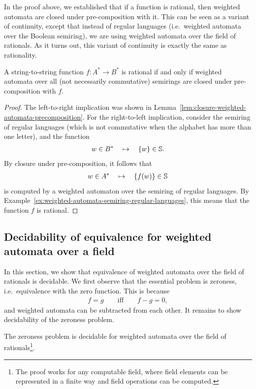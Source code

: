 In the proof above, we established that if a function is rational, then weighted automata are closed under pre-composition with it. This can be seen as a variant of continuity, except that instead of regular languages  (i.e.~weighted automata over the Boolean semiring), we are using weighted automata over the field of rationals. As it turns out, this variant of continuity is exactly the same as rationality.
\begin{theorem}\label{thm:characterisation-rational-functions-weighted-automata}
    A string-to-string function $f : A^* \to B^*$ is rational if and only if weighted automata over all (not necessarily commutative) semirings are closed under pre-composition with $f$.
\end{theorem}

\begin{proof}
    The left-to-right implication was shown in Lemma~\ref{lem:closure-weighted-automata-precomposition}. For the right-to-left implication, consider the semiring of regular languages (which is not commutative when the alphabet has more than one letter), and the  function 
    \begin{align*}
    w \in  B^*  \quad \mapsto \quad \{w\} \in \mathbb S.
    \end{align*}
    By closure under pre-composition, it follows that 
    \begin{align*}
    w \in A^* \quad \mapsto \quad \{f(w)\} \in \mathbb S
    \end{align*}
    is computed by a weighted automaton over the semiring of regular languages. By Example~\ref{ex:weighted-automata-semiring-regular-languages}, this means that the function $f$ is rational.
\end{proof}

\subsection{Decidability of equivalence for weighted automata over a field}
In this section, we show that equivalence of weighted automata over the field of rationals is decidable. We first observe that the essential problem is zeroness, i.e.~equivalence with the zero function. This is because 
\begin{align*}
f = g \qquad \text{iff} \qquad f-g = 0,
\end{align*}
and weighted automata can be subtracted from each other. It remains to show decidability of the zeroness problem.
\begin{theorem}\label{thm:zeroness-weighted-automata}
    The zeroness problem is decidable for weighted automata over the field of rationals\footnote{The proof works for any computable field, where field elements can be represented in a finite way and field operations can be computed.}.
\end{theorem}

